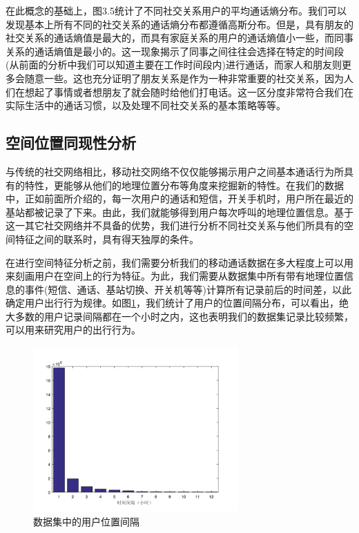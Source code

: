 在此概念的基础上，图3.5统计了不同社交关系用户的平均通话熵分布。我们可以发现基本上所有不同的社交关系的通话熵分布都遵循高斯分布。但是，具有朋友的社交关系的通话熵值是最大的，而具有家庭关系的用户的通话熵值小一些，而同事关系的通话熵值是最小的。这一现象揭示了同事之间往往会选择在特定的时间段(从前面的分析中我们可以知道主要在工作时间段内)进行通话，而家人和朋友则更多会随意一些。这也充分证明了朋友关系是作为一种非常重要的社交关系，因为人们在想起了事情或者想朋友了就会随时给他们打电话。这一区分度非常符合我们在实际生活中的通话习惯，以及处理不同社交关系的基本策略等等。

\subsection{空间位置同现性分析}

与传统的社交网络相比，移动社交网络不仅仅能够揭示用户之间基本通话行为所具有的特性，更能够从他们的地理位置分布等角度来挖掘新的特性。在我们的数据中，正如前面所介绍的，每一次用户的通话和短信，开关手机时，用户所在最近的基站都被记录了下来。由此，我们就能够得到用户每次呼叫的地理位置信息。基于这一其它社交网络并不具备的优势，我们进行分析不同社交关系与他们所具有的空间特征之间的联系时，具有得天独厚的条件。

在进行空间特征分析之前，我们需要分析我们的移动通话数据在多大程度上可以用来刻画用户在空间上的行为特征。为此，我们需要从数据集中所有带有地理位置信息的事件(短信、通话、基站切换、开关机等等)计算所有记录前后的时间差，以此确定用户出行行为规律。如图\ref{fig-position-stamp}，我们统计了用户的位置间隔分布，可以看出，绝大多数的用户记录间隔都在一个小时之内，这也表明我们的数据集记录比较频繁，可以用来研究用户的出行行为。

\begin{figure}[ht]
    \centering
    \includegraphics[scale=1, width=0.7\textwidth]{figure/timestamp.PNG}
    \caption{数据集中的用户位置间隔}
    \label{fig-position-stamp}
\end{figure}


